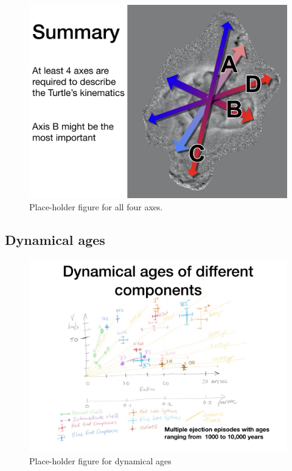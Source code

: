 \documentclass[useAMS, usenatbib, a4paper]{mnras}
\begin{document}
\begin{figure}
  \includegraphics[width=\linewidth]
  {talk-figs/turtle-talk-morelia-2020-02-export-014}
  \caption{Place-holder figure for all four axes.}
  \label{fig:flow-axes-ABCD}
\end{figure}

\subsection{Dynamical ages}
\label{sec:dynamical-ages}

\begin{figure}
  \includegraphics[width=\linewidth]
  {talk-figs/turtle-talk-morelia-2020-02-export-013}
  \caption{Place-holder figure for dynamical ages}
  \label{fig:ages}
\end{figure}



\bsp	%
\label{lastpage}
\end{document}
